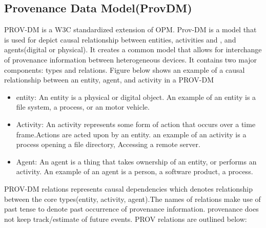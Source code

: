 \subsection{Provenance Data Model(Prov\-DM)}

PROV-DM is a W3C standardized extension of OPM. Prov-DM is a model that is used for depict causal relationship between entities, activities and , and agents(digital or physical).  It creates a common model that allows for interchange of provenance information between heterogeneous devices. It contains two major components: types and relations. Figure below shows an example of a causal relationship between an entity, agent, and activity in a PROV-DM

%
%
\begin{itemize}

\item entity: An entity is a physical or digital object. An example of an entity is a file system, a process, or an motor vehicle.

\item Activity: An activity represents some form of action that occurs over a time frame.Actions are acted upon by an entity. an example of an activity is a process opening a file directory, Accessing a remote server.

\item Agent: An agent is a thing that takes ownership of an entity, or performs an activity. An example of an agent is a person, a software product, a process.
\end{itemize}

PROV-DM relations represents causal dependencies which denotes relationship between the core types(entity, activity, agent).The names of relations make use of past tense to denote past occurrence of provenance information. provenance does not keep track/estimate of future events. PROV relations are outlined below:


